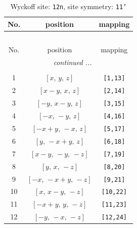 \documentclass[fleqn,8pt]{jsarticle}
\begin{document}
\begin{longtable}{ccc}
\caption{Wyckoff site: {\tt 12n}, site symmetry: {\tt 11'}}
 \\
 \hline \hline
No. & position & mapping \\ \hline \endfirsthead

\multicolumn{2}{l}{\tablename\ \thetable{}} \\
 \hline \hline
No. & position & mapping \\ \hline \endhead

 \hline \hline
\multicolumn{2}{r}{\footnotesize\it continued ...} \\ \endfoot

 \hline \hline
\multicolumn{2}{r}{} \\ \endlastfoot

1 & $\left[ x,\, y,\, z \right]$ & {\tt [1,13]} \\ \hline
2 & $\left[ x - y,\, x,\, z \right]$ & {\tt [2,14]} \\ \hline
3 & $\left[ - y,\, x - y,\, z \right]$ & {\tt [3,15]} \\ \hline
4 & $\left[ - x,\, - y,\, z \right]$ & {\tt [4,16]} \\ \hline
5 & $\left[ - x + y,\, - x,\, z \right]$ & {\tt [5,17]} \\ \hline
6 & $\left[ y,\, - x + y,\, z \right]$ & {\tt [6,18]} \\ \hline
7 & $\left[ x - y,\, - y,\, - z \right]$ & {\tt [7,19]} \\ \hline
8 & $\left[ y,\, x,\, - z \right]$ & {\tt [8,20]} \\ \hline
9 & $\left[ - x,\, - x + y,\, - z \right]$ & {\tt [9,21]} \\ \hline
10 & $\left[ x,\, x - y,\, - z \right]$ & {\tt [10,22]} \\ \hline
11 & $\left[ - x + y,\, y,\, - z \right]$ & {\tt [11,23]} \\ \hline
12 & $\left[ - y,\, - x,\, - z \right]$ & {\tt [12,24]} \\
\end{longtable}
\end{document}
